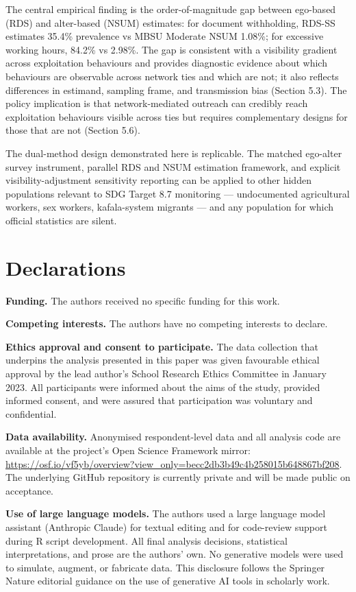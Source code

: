 \documentclass[
  12pt,
  letterpaper,
  DIV=11,
  numbers=noendperiod]{scrartcl}
\begin{document}
The central empirical finding is the order-of-magnitude gap between
ego-based (RDS) and alter-based (NSUM) estimates: for document
withholding, RDS-SS estimates 35.4\% prevalence vs MBSU Moderate NSUM
1.08\%; for excessive working hours, 84.2\% vs 2.98\%. The gap is
consistent with a visibility gradient across exploitation behaviours and
provides diagnostic evidence about which behaviours are observable
across network ties and which are not; it also reflects differences in
estimand, sampling frame, and transmission bias (Section 5.3). The
policy implication is that network-mediated outreach can credibly reach
exploitation behaviours visible across ties but requires complementary
designs for those that are not (Section 5.6).

The dual-method design demonstrated here is replicable. The matched
ego-alter survey instrument, parallel RDS and NSUM estimation framework,
and explicit visibility-adjustment sensitivity reporting can be applied
to other hidden populations relevant to SDG Target 8.7 monitoring ---
undocumented agricultural workers, sex workers, kafala-system migrants
--- and any population for which official statistics are silent.

\section{Declarations}\label{declarations}

\textbf{Funding.} The authors received no specific funding for this
work.

\textbf{Competing interests.} The authors have no competing interests to
declare.

\textbf{Ethics approval and consent to participate.} The data collection
that underpins the analysis presented in this paper was given favourable
ethical approval by the lead author's School Research Ethics Committee
in January 2023. All participants were informed about the aims of the
study, provided informed consent, and were assured that participation
was voluntary and confidential.

\textbf{Data availability.} Anonymised respondent-level data and all
analysis code are available at the project's Open Science Framework
mirror:
\url{https://osf.io/vf5yb/overview?view_only=becc2db3b49c4b258015b648867bf208}.
The underlying GitHub repository is currently private and will be made
public on acceptance.

\textbf{Use of large language models.} The authors used a large language
model assistant (Anthropic Claude) for textual editing and for
code-review support during R script development. All final analysis
decisions, statistical interpretations, and prose are the authors' own.
No generative models were used to simulate, augment, or fabricate data.
This disclosure follows the Springer Nature editorial guidance on the
use of generative AI tools in scholarly work.
\end{document}
